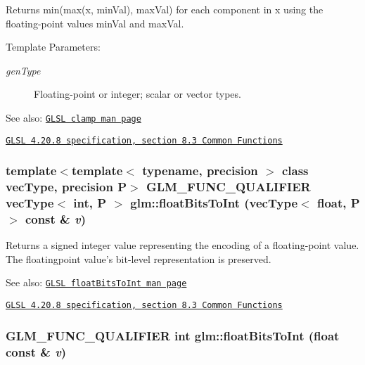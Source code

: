Returns min(max(x, minVal), maxVal) for each component in x using the floating-point values minVal and maxVal.

\begin{Desc}
\item[Template Parameters:]
\begin{description}
\item[{\em genType}]Floating-point or integer; scalar or vector types.\end{description}
\end{Desc}
\begin{Desc}
\item[See also:]\href{http://www.opengl.org/sdk/docs/manglsl/xhtml/clamp.xml}{\tt GLSL clamp man page} 

\href{http://www.opengl.org/registry/doc/GLSLangSpec.4.20.8.pdf}{\tt GLSL 4.20.8 specification, section 8.3 Common Functions} \end{Desc}
\hypertarget{group__core__func__common_gfddf54fe5089c73ff7216e1aa9f02620}{
\subsubsection[floatBitsToInt]{\setlength{\rightskip}{0pt plus 5cm}template$<$template$<$ typename, precision $>$ class vecType, precision P$>$ GLM\_\-FUNC\_\-QUALIFIER vecType$<$ int, P $>$ glm::floatBitsToInt (vecType$<$ float, P $>$ const \& {\em v})}}
\label{group__core__func__common_gfddf54fe5089c73ff7216e1aa9f02620}


Returns a signed integer value representing the encoding of a floating-point value. The floatingpoint value's bit-level representation is preserved.

\begin{Desc}
\item[See also:]\href{http://www.opengl.org/sdk/docs/manglsl/xhtml/floatBitsToInt.xml}{\tt GLSL floatBitsToInt man page} 

\href{http://www.opengl.org/registry/doc/GLSLangSpec.4.20.8.pdf}{\tt GLSL 4.20.8 specification, section 8.3 Common Functions} \end{Desc}
\hypertarget{group__core__func__common_gdc6a536a7bef046c3293d2ccad6d9ca2}{
\subsubsection[floatBitsToInt]{\setlength{\rightskip}{0pt plus 5cm}GLM\_\-FUNC\_\-QUALIFIER int glm::floatBitsToInt (float const \& {\em v})}}
\label{group__core__func__common_gdc6a536a7bef046c3293d2ccad6d9ca2}


